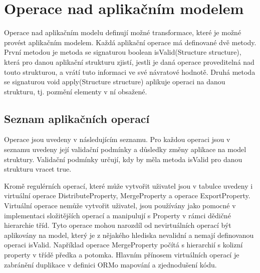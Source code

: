 \documentclass[11pt,twoside,a4paper]{book}
\begin{document}
\section{Operace nad aplikačním modelem} \label{sect:app_ops}
Operace nad aplikačním modelu definují možné transformace, které je možné
provést aplikačním modelem. Každá aplikační operace má definované dvě metody.
První metodou je metoda se signaturou boolean isValid(Structure structure),
která pro danou aplikační strukturu zjistí, jestli je daná operace proveditelná
nad touto strukturou, a vrátí tuto informaci ve své návratové hodnotě. Druhá
metoda se signaturou void apply(Structure structure) aplikuje operaci na danou
strukturu, tj. pozmění elementy v ní obsažené.

\subsection{Seznam aplikačních operací}

Operace jsou uvedeny v následujícím seznamu. Pro každou operaci jsou v seznamu
uvedeny její validační podmínky a důsledky změny aplikace na model struktury.
Validační podmínky určují, kdy by měla metoda isValid pro danou strukturu vracet
true.

Kromě regulérních operací, které může vytvořit uživatel jsou v tabulce uvedeny i
virtuální operace DistributeProperty, MergeProperty a operace ExportProperty.
Virtuální operace nemůže vytvořit uživatel, jsou používány jako pomocné v
implementaci složitějších operací a manipulují s Property v rámci dědičné
hierarchie tříd. Tyto operace mohou narozdíl od nevirtuálních operací být
aplikovány na model, který je z nějakého hlediska nevalidní a nemají
definovanou operaci isValid.
Například operace MergeProperty počítá s hierarchií s kolizní property v třídě
předka a potomka. Hlavním přínosem virtuálních operací je zabránění duplikace v
definici ORMo mapování a zjednodušení kódu.
\end{document}
